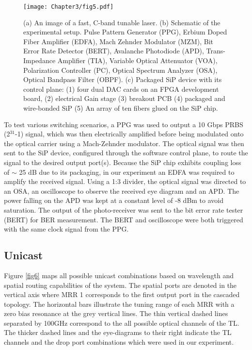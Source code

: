 \begin{figure}[t!]
\begin{center}
\texttt{[image: Chapter3/fig5.pdf]}
\caption{(a) An image of a fast, C-band tunable laser. (b) Schematic of the experimental setup. Pulse Pattern Generator (PPG), Erbium Doped Fiber Amplifier (EDFA), Mach Zehnder Modulator (MZM), Bit Error Rate Detector (BERT), Avalanche Photodiode (APD), Trans-Impedance Amplifier (TIA), Variable Optical Attenuator (VOA), Polarization Controller (PC), Optical Spectrum Analyzer (OSA), Optical Bandpass Filter (OBPF). (c) Packaged SiP device with its control plane: (1) four dual DAC cards on an FPGA development board, (2) electrical Gain stage (3) breakout PCB (4) packaged and wire-bonded SiP (5) An array of ten fibers glued on the SiP chip. }
\label{fig5}
\end{center}
\vspace{-0.9cm}
\end{figure}

To test various switching scenarios, a PPG was used to output a 10 Gbps PRBS (2$^{31}$-1) signal, which was then electrically amplified before being modulated onto the optical carrier using a Mach-Zehnder modulator. The optical signal was then sent to the SiP device, configured through the software control plane, to route the signal to the desired output port(s). Because the SiP chip exhibits coupling loss of $\sim$ 25 dB due to its packaging, in our experiment an EDFA was required to amplify the received signal. Using a 1:3 divider, the optical signal was directed to an OSA, an oscilloscope to observe the received eye diagram and an APD. The power falling on the APD was kept at a constant level of -8 dBm to avoid saturation. The output of the photo-receiver was sent to the bit error rate tester (BERT) for BER measurement. The BERT and oscilloscope were both triggered with the same clock signal from the PPG.


\subsection{Unicast}

Figure \ref{fig6} maps all possible unicast combinations based on wavelength and spatial routing capabilities of the system. The spatial ports are denoted in the vertical axis where MRR 1 corresponds to the first output port in the cascaded topology. The horizontal bars illustrate the tuning range of each MRR with a zero bias resonance at the grey vertical lines. The thin vertical dashed lines separated by 100GHz correspond to the all possible optical channels of the TL. The thicker dashed lines and the eye-diagrams to their right indicate the TL channels and the drop port combinations which were used in our experiment. 

